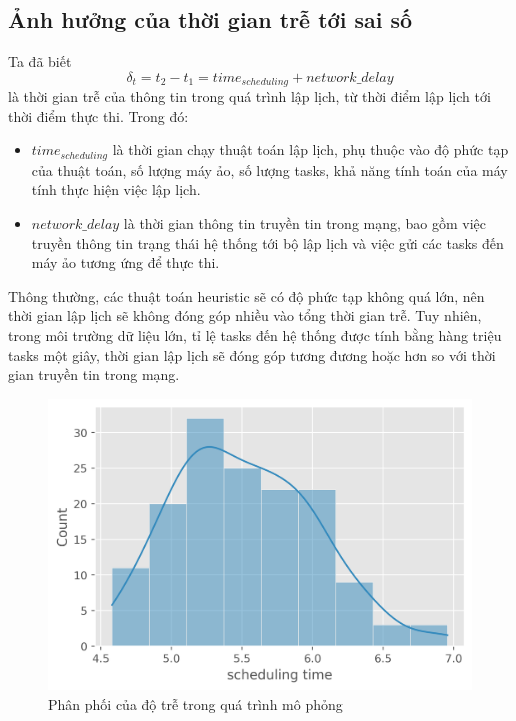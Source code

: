 \documentclass{my_style}
\begin{document}
\subsection{Ảnh hưởng của thời gian trễ tới sai số}
Ta đã biết 
\[
	\delta_{t} = t_{2} - t_{1} = time_{scheduling} + network\_delay
\]
là thời gian trễ của thông tin trong quá trình lập lịch, từ thời điểm lập lịch tới thời điểm thực thi. Trong đó: 
\begin{itemize}
	\item $time_{scheduling}$ là thời gian chạy thuật toán lập lịch, phụ thuộc vào độ phức tạp của thuật toán, số lượng máy ảo, số lượng tasks, khả năng tính toán của máy tính thực hiện việc lập lịch.
	\item $network\_delay$ là thời gian thông tin truyền tin trong mạng, bao gồm việc truyền thông tin trạng thái hệ thống tới bộ lập lịch và việc gửi các tasks đến máy ảo tương ứng để thực thi.
\end{itemize} 
Thông thường, các thuật toán heuristic sẽ có độ phức tạp không quá lớn, nên thời gian lập lịch sẽ không đóng góp nhiều vào tổng thời gian trễ. Tuy nhiên, trong môi trường dữ liệu lớn, tỉ lệ tasks đến hệ thống được tính bằng hàng triệu tasks một giây, thời gian lập lịch sẽ đóng góp tương đương hoặc hơn so với thời gian truyền tin trong mạng.
\begin{figure}[h!]
	\centering
	\includegraphics[scale=0.8]{images/scheduling_time_distribution.png}
	\caption{Phân phối của độ trễ trong quá trình mô phỏng}
	\label{fig:scheduling_time_dist}
\end{figure}
\end{document}
